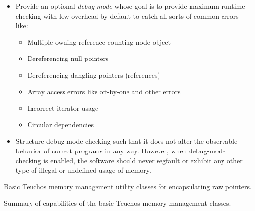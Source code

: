 \documentclass[pdf,ps2pdf,11pt]{SANDreport}
\begin{document}
\begin{itemize}
{}\item Provide an optional {}\textit{debug mode} whose goal is to
provide maximum runtime checking with low overhead by default to catch
all sorts of common errors like:

  \begin{itemize}
  {}\item Multiple owning reference-counting node object
  {}\item Dereferencing null pointers
  {}\item Dereferencing dangling pointers (references)
  {}\item Array access errors like off-by-one and other errors
  {}\item Incorrect iterator usage
  {}\item Circular dependencies
  \end{itemize}

{}\item Structure debug-mode checking such that it does not alter the
observable behavior of correct programs in any way.  However, when
debug-mode checking is enabled, the software should never segfault or
exhibit any other type of illegal or undefined usage of memory.

\end{itemize}


\begin{table}
\begin{center}

\end{center}
\caption{\label{tbl:BasicSingleArrayTypes}
Basic Teuchos memory management utility classes for encapsulating raw
pointers.}
\end{table}


\begin{table}
\begin{center}

\end{center}
\caption{\label{tbl:TypesSummary}
Summary of capabilities of the basic Teuchos memory management
classes.}
\end{table}
\end{document}
